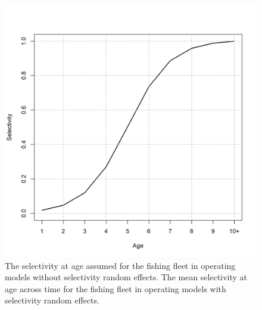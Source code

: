\documentclass[
  12pt,
]{article}
\begin{document}
\begin{figure}
\caption{The selectivity at age assumed for the fishing fleet in operating models without selectivity random effects. The mean selectivity at age across time for the fishing fleet in operating models with selectivity random effects.}\label{om_mean_selectivity}
\begin{center}
\includegraphics[width = \textwidth]{om_mean_selectivity.png}
\end{center}
\end{figure}
\end{document}
